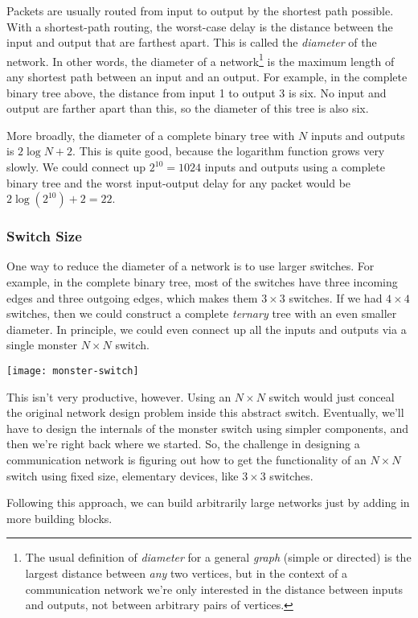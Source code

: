 Packets are usually routed from input to output by the shortest
path possible.  With a shortest-path routing, the worst-case delay is the
distance between the input and output that are farthest apart.  This is
called the \emph{diameter}%
of the network.  In other words, the diameter
of a network\footnote{The usual definition of \emph{diameter}%
for a general \textit{graph} (simple or directed) is the largest distance
between \emph{any} two vertices, but in the context of a communication
network we're only interested in the distance between inputs and outputs,
not between arbitrary pairs of vertices.} is the maximum length of any
shortest path between an input and an output.  For example, in the
complete binary tree above, the distance from input 1 to output 3 is six.
No input and output are farther apart than this, so the diameter of this
tree is also six.

More broadly, the diameter of a complete binary tree with $N$ inputs
and outputs is $2 \log N + 2$.  This is quite good, because the
logarithm function grows very slowly.  We could connect up $2^{10} =
1024$ inputs and outputs using a complete binary tree and the worst
input-output delay for any packet would be $2 \log(2^{10}) + 2 = 22$.

\subsubsection{Switch Size}

One way to reduce the diameter of a network is to use larger switches.
For example, in the complete binary tree, most of the switches have
three incoming edges and three outgoing edges, which makes them $3
\times 3$ switches.  If we had $4 \times 4$ switches, then we could
construct a complete \textit{ternary} tree with an even smaller
diameter.  In principle, we could even connect up all the inputs and
outputs via a single monster $N \times N$ switch.

\begin{editingnotes}
\texttt{[image: monster-switch]}
\end{editingnotes}

This isn't very productive, however. Using an $N \times N$ switch
would just conceal the original network design problem inside this
abstract switch.  Eventually, we'll have to design the internals of
the monster switch using simpler components, and then we're right back
where we started.  So, the challenge in designing a communication
network is figuring out how to get the functionality of an $N \times
N$ switch using fixed size, elementary devices, like $3 \times 3$
switches.
\begin{solution}
Following this approach, we can build arbitrarily large networks
just by adding in more building blocks. 
\end{solution}

